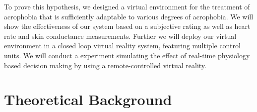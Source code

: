 To prove this hypothesis, we designed a virtual environment for the treatment of acrophobia that is sufficiently adaptable to various degrees of acrophobia. We will show the effectiveness of our system based on a subjective rating as well as heart rate and skin conductance measurements. Further we will deploy our virtual environment in a closed loop virtual reality system, featuring multiple control units. We will conduct a experiment simulating the effect of real-time physiology based decision making by using a remote-controlled virtual reality.\\











\section{Theoretical Background}

